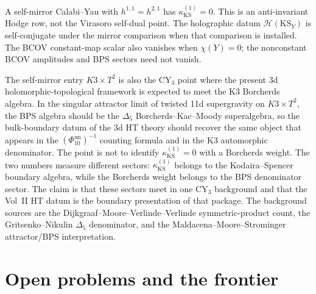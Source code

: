 \begin{remark}
A self-mirror Calabi--Yau with $h^{1,1} = h^{2,1}$ has
$\kappa_{\mathrm{KS}}^{(1)} = 0$. This is an anti-invariant Hodge
row, not the Virasoro self-dual point.
The holographic datum $\mathcal{H}(\mathrm{KS}_Y)$ is self-conjugate
under the mirror comparison when that comparison is installed. The
BCOV constant-map scalar also vanishes when $\chi(Y)=0$; the
nonconstant BCOV amplitudes and BPS sectors need not vanish.
\end{remark}

\begin{conjecture}
\label{conj:k3t2-bps-gravity-face}
The self-mirror entry $K3 \times T^2$ is also the CY$_3$ point where
the present 3d holomorphic-topological framework is expected to meet
the K3 Borcherds algebra. In the singular attractor limit of twisted
11d supergravity on $K3 \times T^2$, the BPS algebra should be the
$\Delta_5$ Borcherds--Kac--Moody superalgebra, so the bulk-boundary
datum of the 3d HT theory should recover the same object that appears
in the $(\Phi_{10}^{\mathrm{un}})^{-1}$ counting formula and in the K3 automorphic
denominator. The point is not to identify
$\kappa_{\mathrm{KS}}^{(1)} = 0$ with a Borcherds weight. The two numbers
measure different sectors: $\kappa_{\mathrm{KS}}^{(1)}$ belongs to the
Kodaira--Spencer boundary algebra, while the Borcherds weight belongs
to the BPS denominator sector. The claim is that these sectors meet in
one CY$_3$ background and that the Vol~II HT datum is the boundary
presentation of that package. The background sources are the
Dijkgraaf--Moore--Verlinde--Verlinde symmetric-product count, the
Gritsenko--Nikulin $\Delta_5$ denominator, and the
Maldacena--Moore--Strominger attractor/BPS interpretation.
\end{conjecture}


%
%

\section{Open problems and the frontier}

